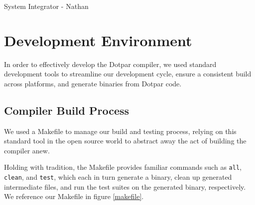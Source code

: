 System Integrator - Nathan

\section{Development Environment}

In order to effectively develop the Dotpar compiler, we used standard
development tools to streamline our development cycle, ensure a
consistent build across platforms, and generate binaries from Dotpar
code.

\subsection{Compiler Build Process}

We used a Makefile to manage our build and testing process, relying on
this standard tool in the open source world to abstract away the act
of building the compiler anew.

Holding with tradition, the Makefile provides familiar commands such
as \texttt{all}, \texttt{clean}, and \texttt{test}, which each in turn
generate a binary, clean up generated intermediate files, and run the
test suites on the generated binary, respectively. We reference our
Makefile in figure \ref{makefile}.

